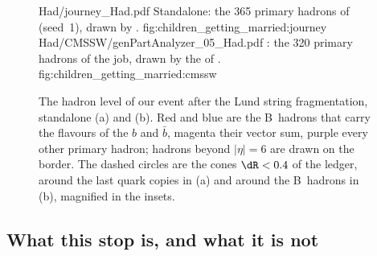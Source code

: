 \begin{figure}[p]\centering
\ledgerdisplays
  {Had/journey_Had.pdf}
  {Standalone: the 365 primary hadrons of  (seed~1), drawn by .}
  {fig:children_getting_married:journey}
  {Had/CMSSW/genPartAnalyzer_05_Had.pdf}
  {\CMSSW: the 320 primary hadrons of the  job, drawn by the  of .}
  {fig:children_getting_married:cmssw}
\caption[The event after hadronisation in the $(\eta,\phi)$ plane,
standalone and \CMSSW]{The hadron level of our event after the Lund string
fragmentation, standalone (a) and \CMSSW (b). Red and blue are the
B~hadrons that carry the flavours of the $b$ and $\bar b$, magenta their
vector sum, purple every other primary hadron; hadrons beyond $|\eta|=6$
are drawn on the border. The dashed circles are the cones $\dR<0.4$ of the
ledger, around the last quark copies in (a) and around the B~hadrons in
(b), magnified in the insets.}
\label{fig:children_getting_married:displays}
\end{figure}

\subsection{What this stop is, and what it is not}
\label{sec:children_getting_married:caveats}

